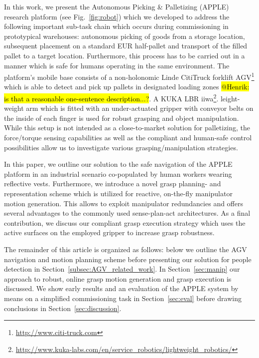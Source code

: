 In this work, we present the Autonomous Picking \& Palletizing (APPLE) research platform (see
Fig.~\ref{fig:robot}) which we developed to address the following important sub-task chain which
occurs during commissioning in prototypical warehouses: autonomous picking of goods from a storage
location, subsequent placement on a standard EUR half-pallet and transport of the filled pallet to a
target location. Furthermore, this process has to be carried out in a manner which is safe for
humans operating in the same environment. The platform's mobile base consists of a non-holonomic
Linde CitiTruck forklift AGV\footnote{\url{ http://www.citi-truck.com}} which is able to detect and
pick up pallets in designated loading zones \hl{@Henrik: is that a reasonable one-sentence
  description...?}. A KUKA LBR
iiwa\footnote{\url{http://www.kuka-labs.com/en/service_robotics/lightweight_robotics/}}.
leight-weight arm which is fitted with an under-actuated gripper with conveyor belts on the inside
of each finger is used for robust grasping and object manipulation. While this setup is not intended
as a close-to-market solution for palletizing, the force/torque sensing capabilities as well as the
compliant and human-safe control possibilities allow us to investigate various grasping/manipulation
strategies.

  In this paper, we outline our solution to the safe navigation of the APPLE platform in
an industrial scenario co-populated by human workers wearing reflective vests. Furthermore, we
introduce a novel grasp planning- and representation scheme which is utilized for reactive,
on-the-fly manipulator motion generation. This allows to exploit manipulator redundancies and offers
several advantages to the commonly used sense-plan-act architectures. As a final contribution, we
discuss our compliant grasp execution strategy which uses the active surfaces on the employed
gripper to increase grasp robustness.

The remainder of this article is organized as follows: below we outline the AGV navigation and
motion planning scheme before presenting our solution for people detection in
Section~\ref{subsec:AGV_related_work}. In Section~\ref{sec:manip} our approach to robust, online
grasp motion generation and grasp execution is discussed. We show early results and an evaluation of
the APPLE system by means on a simplified commissioning task in Section~\ref{sec:eval} before
drawing conclusions in Section~\ref{sec:discussion}.
